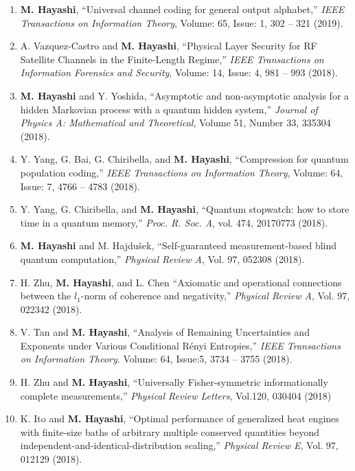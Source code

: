 \documentclass[a4paper,12pt,oneside]{article}
\begin{document}
\begin{enumerate}
\item 
\textbf{M. Hayashi},
``Universal channel coding for general output alphabet,'' 
{\em IEEE Transactions on Information Theory},
Volume: 65, Issue: 1, 302 -- 321 (2019). 

\item 
A. Vazquez-Castro and \textbf{M. Hayashi},
``Physical Layer Security for RF Satellite Channels in the Finite-Length Regime,'' 
{\em IEEE Transactions on Information Forensics and Security},
Volume: 14, Issue: 4,  981 -- 993 (2018).

\item 
\textbf{M. Hayashi} and Y. Yoshida,
``Asymptotic and non-asymptotic analysis for a hidden Markovian process with a quantum hidden system,''
{\em Journal of Physics A: Mathematical and Theoretical}, 
Volume 51, Number 33, 335304 (2018).

\item 
Y. Yang, G. Bai, G. Chiribella, and \textbf{M. Hayashi}, 
``Compression for quantum population coding,''
{\em IEEE Transactions on Information Theory},
Volume: 64, Issue: 7, 4766 -- 4783 (2018). 

\item 
Y. Yang, G. Chiribella, and
\textbf{M. Hayashi},
``Quantum stopwatch: how to store time in a quantum memory,''
{\em Proc. R. Soc. A}, vol. 474, 20170773 (2018).

\item 
\textbf{M. Hayashi} and M. Hajdu\v{s}ek,
``Self-guaranteed measurement-based blind quantum computation,'' 
{\em Physical Review A}, Vol. 97, 052308 (2018).

\item 
H. Zhu, \textbf{M. Hayashi}, and L. Chen
``Axiomatic and operational connections between the $l_1$-norm of coherence and negativity,''
{\em Physical Review A}, Vol. 97, 022342 (2018).

\item 
V. Tan and \textbf{M. Hayashi},
``Analysis of Remaining Uncertainties and Exponents under Various Conditional R\'{e}nyi Entropies,''
{\em IEEE Transactions on Information Theory}.
Volume: 64, Issue:5, 3734 -- 3755 (2018). 

\item 
H. Zhu and \textbf{M. Hayashi},
``Universally Fisher-symmetric informationally complete measurements,''
{\em Physical Review Letters}, Vol.120, 030404 (2018)

\item 
K. Ito and \textbf{M. Hayashi},
``Optimal performance of generalized heat engines with finite-size baths
of arbitrary multiple conserved quantities beyond independent-and-identical-distribution scaling,''
{\em Physical Review E}, Vol. 97, 012129 (2018).


\end{enumerate}
\end{document}
